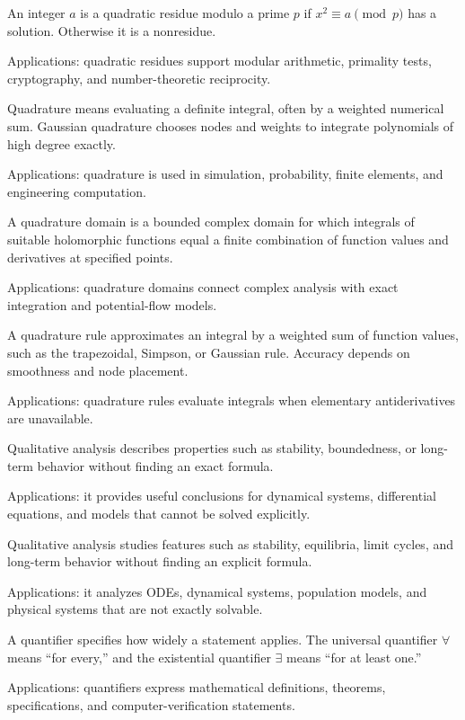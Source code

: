 An integer $a$ is a quadratic residue modulo a prime $p$ if $x^2\equiv a\pmod p$ has a solution. Otherwise it is a nonresidue. \par\noindent Applications: quadratic residues support modular arithmetic, primality tests, cryptography, and number-theoretic reciprocity.

Quadrature means evaluating a definite integral, often by a weighted numerical sum. Gaussian quadrature chooses nodes and weights to integrate polynomials of high degree exactly. \par\noindent Applications: quadrature is used in simulation, probability, finite elements, and engineering computation.

A quadrature domain is a bounded complex domain for which integrals of suitable holomorphic functions equal a finite combination of function values and derivatives at specified points. \par\noindent Applications: quadrature domains connect complex analysis with exact integration and potential-flow models.

A quadrature rule approximates an integral by a weighted sum of function values, such as the trapezoidal, Simpson, or Gaussian rule. Accuracy depends on smoothness and node placement. \par\noindent Applications: quadrature rules evaluate integrals when elementary antiderivatives are unavailable.

Qualitative analysis describes properties such as stability, boundedness, or long-term behavior without finding an exact formula. \par\noindent Applications: it provides useful conclusions for dynamical systems, differential equations, and models that cannot be solved explicitly.

Qualitative analysis studies features such as stability, equilibria, limit cycles, and long-term behavior without finding an explicit formula. \par\noindent Applications: it analyzes ODEs, dynamical systems, population models, and physical systems that are not exactly solvable.

A quantifier specifies how widely a statement applies. The universal quantifier $\forall$ means “for every,” and the existential quantifier $\exists$ means “for at least one.” \par\noindent Applications: quantifiers express mathematical definitions, theorems, specifications, and computer-verification statements.

